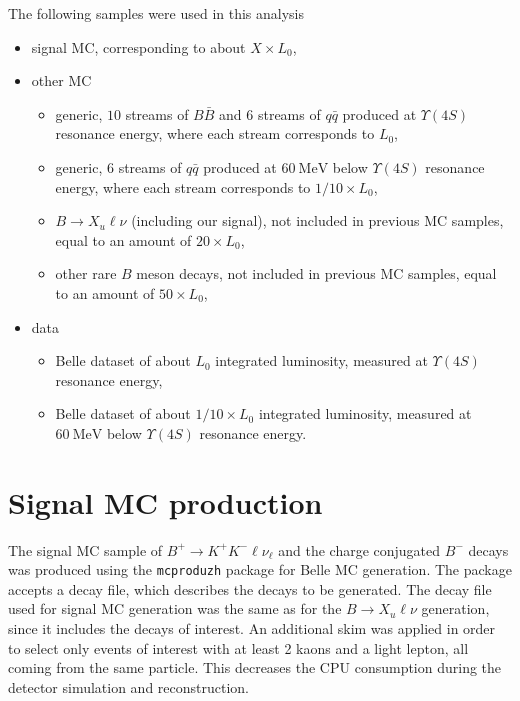 \documentclass[headings=standardclasses,headings=big,oneside,a4paper,openany,12pt]{scrbook}
\newcommand {\e}[1]{\mathrm{~#1}}
\begin{document}
The following samples were used in this analysis
\begin{itemize}
\item signal MC, corresponding to about $X \times L_0$,
\item other MC
\begin{itemize}
\item generic, $10$ streams of $B\bar B$ and $6$ streams of $q\bar q$ produced at $\Upsilon(4S)$ resonance energy, where each stream corresponds to $L_0$,
\item generic, $6$ streams of $q\bar q$ produced at $60\e{MeV}$ below $\Upsilon(4S)$ resonance energy, where each stream corresponds to $1/10 \times L_0$,
\item $B\to X_u \ell \nu$ (including our signal), not included in previous MC samples, equal to an amount of $20 \times L_0$, 
\item other rare $B$ meson decays, not included in previous MC samples, equal to an amount of $50 \times L_0$, 
\end{itemize}
\item data
\begin{itemize}
\item Belle dataset of about $L_0$ integrated luminosity, measured at $\Upsilon(4S)$ resonance energy,
\item Belle dataset of about $1/10 \times L_0$ integrated luminosity, measured at $60\e{MeV}$ below $\Upsilon(4S)$ resonance energy.
\end{itemize}
\end{itemize}

\section{Signal MC production}

The signal MC sample of $B^+ \to K^+ K^- \ell \nu_\ell$ and the charge conjugated $B^-$ decays was produced using the \texttt{mcproduzh} package for Belle MC generation. The package accepts a decay file, which describes the decays to be generated. The decay file used for signal MC generation was the same as for the $B\to X_u \ell \nu$ generation, since it includes the decays of interest. An additional skim was applied in order to select only events of interest with at least 2 kaons and a light lepton, all coming from the same particle. This decreases the CPU consumption during the detector simulation and reconstruction.
\end{document}
